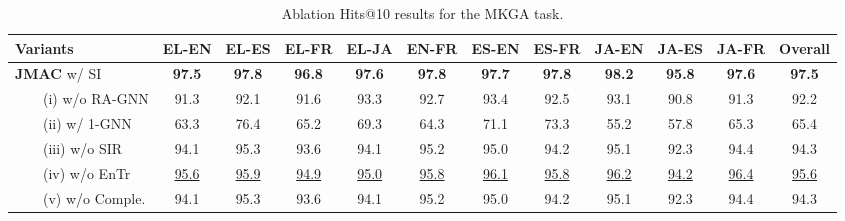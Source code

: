 \documentclass[11pt]{article}
\begin{document}
\begin{table*}[!t]
    \begin{adjustbox}{width=440pt,center}
    \centering
    \setlength{\tabcolsep}{0.3em}
    \begin{tabular}{l|c|c|c|c|c|c|c|c|c|c|c}
    \hline
    \textbf{Variants} & \textbf{EL-EN} & \textbf{EL-ES} & \textbf{EL-FR} & \textbf{EL-JA} & \textbf{EN-FR} & \textbf{ES-EN} & \textbf{ES-FR} & \textbf{JA-EN} & \textbf{JA-ES} &  \textbf{JA-FR} & \textbf{Overall} \\
\hline
    \textbf{JMAC}  w/ SI & \bf 97.5 & \bf 97.8 & \bf 96.8 & \bf 97.6 & \bf 97.8 & \bf 97.7 & \bf 97.8 & \bf 98.2 & \bf 95.8 & \bf 97.6 & \bf 97.5 \\
    \hline
    \ \ \ \ (i) w/o RA-GNN & 91.3 & 92.1 & 91.6 & 93.3 & 92.7 & 93.4 & 92.5 & 93.1 & 90.8 & 91.3 & 92.2 \\
    \ \ \ \ (ii) w/ 1-GNN & 63.3 & 76.4 & 65.2 & 69.3 & 64.3 & 71.1 & 73.3 & 55.2 & 57.8 & 65.3 & 65.4 \\
    \ \ \ \ (iii) w/o SIR & 94.1 & 95.3 & 93.6 & 94.1 & 95.2 & 95.0 & 94.2 & 95.1 & 92.3 & 94.4 & 94.3 \\
    \ \ \ \ (iv) w/o EnTr & \underline{95.6} & \underline{95.9} & \underline{94.9} & \underline{95.0} & \underline{95.8} & \underline{96.1} & \underline{95.8} & \underline{96.2} & \underline{94.2} & \underline{96.4} & \underline{95.6}  \\
    \ \ \ \ (v) w/o Comple. & 94.1 & 95.3 & 93.6 & 94.1 & 95.2 & 95.0 & 94.2 & 95.1 & 92.3 & 94.4 & 94.3 \\
    \hline
    \end{tabular}
    \end{adjustbox}
    \caption{Ablation Hits@10 results for the MKGA task.}
    \label{tab:ablation_kga_detailhit10}
\end{table*}
\end{document}
